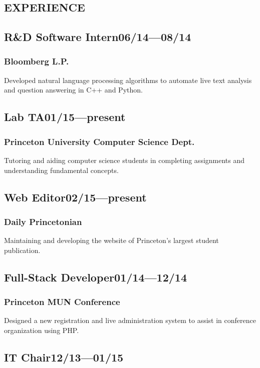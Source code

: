 \documentclass[11pt]{article}
\begin{document}
\begin{multicols}{2}
\section*{EXPERIENCE}
\subsection*{R\&D Software Intern\hfill\textnormal{06/14---08/14}}
\subsubsection*{Bloomberg L.P.}
Developed natural language processing algorithms to automate live text analysis and question answering in C++ and Python.

\subsection*{Lab TA\hfill\textnormal{01/15---present}}
\subsubsection*{Princeton University Computer Science Dept.}
Tutoring and aiding computer science students in completing assignments and understanding fundamental concepts.

\subsection*{Web Editor\hfill\textnormal{02/15---present}}
\subsubsection*{Daily Princetonian}
Maintaining and developing the website of Princeton's largest student publication.

\subsection*{Full-Stack Developer\hfill\textnormal{01/14---12/14}}
\subsubsection*{Princeton MUN Conference}
Designed a new registration and live administration system to assist in conference organization using PHP.

\subsection*{IT Chair\hfill\textnormal{12/13---01/15}}

\end{multicols}
\end{document}
